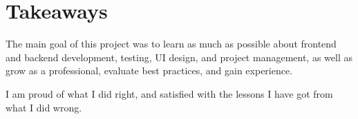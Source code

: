 \section{Takeaways}\label{sec:takeaways}

The main goal of this project
was to learn as much as possible about
frontend and backend development,
testing,
UI design, and
project management,
as well as grow as a professional,
evaluate best practices,
and gain experience.

I am proud of what I did right,
and satisfied with the lessons
I have got from what I did wrong.




